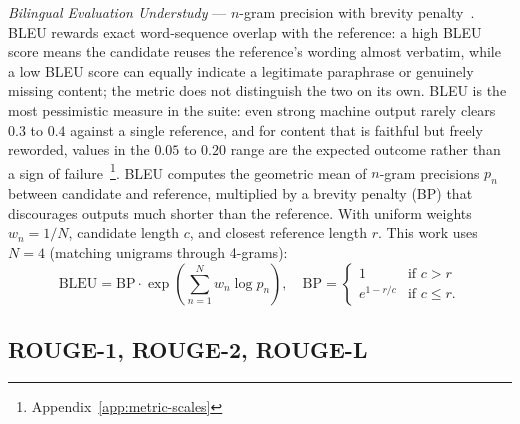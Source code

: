 \emph{Bilingual Evaluation Understudy} --- $n$-gram precision with brevity penalty~\cite{Papineni2002}. BLEU rewards exact word-sequence overlap with the reference: a high BLEU score means the candidate reuses the reference's wording almost verbatim, while a low BLEU score can equally indicate a legitimate paraphrase or genuinely missing content; the metric does not distinguish the two on its own. BLEU is the most pessimistic measure in the suite: even strong machine output rarely clears $0.3$ to $0.4$ against a single reference, and for content that is faithful but freely reworded, values in the $0.05$ to $0.20$ range are the expected outcome rather than a sign of failure~\footnote{Appendix~\ref{app:metric-scales}}.
BLEU computes the geometric mean of $n$-gram precisions $p_n$ between candidate and reference, multiplied by a brevity penalty (BP) that discourages outputs much shorter than the reference. With uniform weights $w_n = 1/N$, candidate length $c$, and closest reference length $r$. This work uses $N = 4$ (matching unigrams through 4-grams):
\begin{equation}
\label{eq:bleu}
\mathrm{BLEU} = \mathrm{BP} \cdot \exp\!\left( \sum_{n=1}^{N} w_n \log p_n \right),
\quad
\mathrm{BP} =
\begin{cases}
1 & \text{if } c > r \\
e^{1 - r/c} & \text{if } c \leq r.
\end{cases}
\end{equation}


\subsection{ROUGE-1, ROUGE-2, ROUGE-L}

